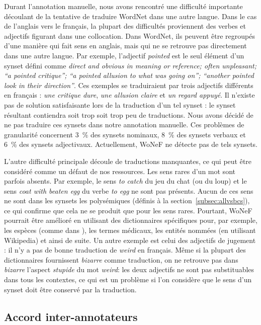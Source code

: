 Durant l'annotation manuelle, nous avons rencontré une difficulté importante
découlant de la tentative de traduire WordNet dans une autre langue. Dans le
cas de l'anglais vers le français, la plupart des difficultés proviennent des
verbes et adjectifs figurant dans une collocation. Dans WordNet, ils peuvent
être regroupés d'une manière qui fait sens en anglais, mais qui ne se retrouve
pas directement dans une autre langue. Par exemple, l'adjectif \textit{pointed}
est le seul élément d'un synset défini comme \textit{direct and obvious in
meaning or reference; often unpleasant; ``a pointed critique''; ``a pointed
allusion to what was going on''; ``another pointed look in their direction''}.
Ces exemples se traduiraient par trois adjectifs différents en français :
\textit{une critique dure}, \textit{une allusion claire} et \textit{un regard
appuyé}. Il n'existe pas de solution satisfaisante lors de la traduction d'un
tel synset : le synset résultant contiendra soit trop soit trop peu de
traductions. Nous avons décidé de ne pas traduire ces synsets dans notre
annotation manuelle. Ces problèmes de granularité concernent 3~\% des synsets
nominaux, 8~\% des synsets verbaux et 6~\% des synsets adjectivaux.
Actuellement, WoNeF ne détecte pas de tels synsets.

L'autre difficulté principale découle de traductions manquantes, ce qui peut
être considéré comme un défaut de nos ressources. Les sens rares d'un mot sont
parfois absents. Par exemple, le sens \textit{to catch} du jeu du chat (ou du
loup) et le sens \textit{coat with beaten egg} du verbe \textit{to egg} ne sont
pas présents. Aucun de ces sens ne sont dans les synsets les polysémiques
(définis à la section~\ref{subsec:allvsbcs}), ce qui confirme que cela ne se
produit que pour les sens rares. Pourtant, WoNeF pourrait être amélioré en
utilisant des dictionnaires spécifiques pour, par exemple, les espèces (comme
dans \cite{sagot2008construction}), les termes médicaux, les entités nommées
(en utilisant Wikipedia) et ainsi de suite. Un autre exemple est celui des
adjectifs de jugement : il n'y a pas de bonne traduction de \textit{weird} en
français. Même si la plupart des dictionnaires fournissent \textit{bizarre}
comme traduction, on ne retrouve pas dans \textit{bizarre} l'aspect
\textit{stupide} du mot \textit{weird}: les deux adjectifs ne sont pas
substituables dans tous les contextes, ce qui est un problème si l'on considère
que le sens d'un synset doit être conservé par la traduction.

\subsection{Accord inter-annotateurs}
\label{subsec:interannotator_agreement}

